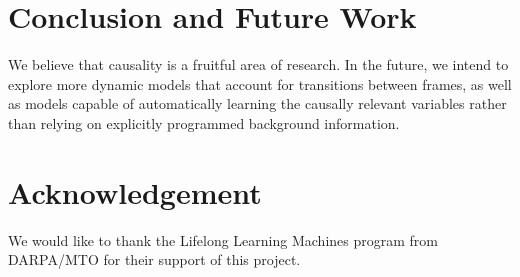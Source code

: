 \documentclass{article}
\begin{document}










\section{Conclusion and Future Work}
We believe that causality is a fruitful area of research. In the future, we intend to explore more dynamic models that account for transitions between frames, as well as models capable of automatically learning the causally relevant variables rather than relying on explicitly programmed background information.








\section{Acknowledgement}

We would like to thank the Lifelong Learning Machines program from DARPA/MTO for their support of this project.













\end{document}

